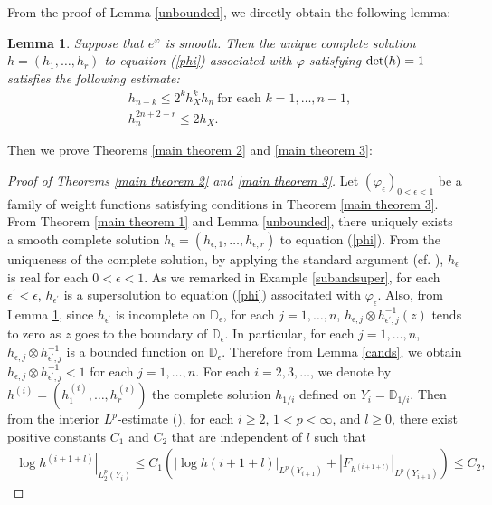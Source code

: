 \documentclass[12pt]{article}
\theoremstyle{definition}
\newtheorem{lemm}[defi]{Lemma}
\def\det{{\rm det}}
\def\det{{\rm det}}
\def\D{{\mathbb D}}
\begin{document}
From the proof of Lemma \ref{unbounded}, we directly obtain the following lemma:
\begin{lemm}\label{khn}{\it Suppose that $e^\varphi$ is smooth. Then the unique complete solution $h=(h_1,\dots, h_r)$ to equation (\ref{phi}) associated with $\varphi$ satisfying $\det(h)=1$ satisfies the following estimate:
\begin{align}
&h_{n-k}\leq 2^kh_X^kh_n \ \text{for each $k=1,\dots, n-1$}, \\
&h_n^{2n+2-r}\leq 2h_X.
\end{align}
}
\end{lemm}
Then we prove Theorems \ref{main theorem 2} and \ref{main theorem 3}:
\begin{proof}[Proof of Theorems \ref{main theorem 2} and \ref{main theorem 3}] Let $(\varphi_\epsilon)_{0<\epsilon<1}$ be a family of weight functions satisfying conditions in Theorem \ref{main theorem 3}. From Theorem \ref{main theorem 1} and Lemma \ref{unbounded}, there uniquely exists a smooth complete solution $h_\epsilon=(h_{\epsilon,1},\dots, h_{\epsilon,r})$ to equation (\ref{phi}). From the uniqueness of the complete solution, by applying the standard argument (cf. \cite[Corollary 3.27]{LM1}), $h_\epsilon$ is real for each $0<\epsilon<1$. As we remarked in Example \ref{subandsuper}, for each $\epsilon^\prime<\epsilon$, $h_{\epsilon^\prime}$ is a supersolution to equation (\ref{phi}) associtated with $\varphi_\epsilon$. Also, from Lemma \ref{khn}, since $h_{\epsilon^\prime}$ is incomplete on $\D_\epsilon$, for each $j=1,\dots, n$, $h_{\epsilon,j}\otimes h_{\epsilon^\prime,j}^{-1}(z)$ tends to zero as $z$ goes to the boundary of $\D_\epsilon$. In particular, for each $j=1,\dots, n$, $h_{\epsilon,j}\otimes h_{\epsilon^\prime,j}^{-1}$ is a bounded function on $\D_\epsilon$. Therefore from Lemma \ref{cands}, we obtain $h_{\epsilon,j}\otimes h_{\epsilon^\prime,j}^{-1}<1$ for each $j=1,\dots, n$. For each $i=2,3,\dots$, we denote by $h^{(i)}=(h^{(i)}_1,\dots, h^{(i)}_r)$ the complete solution $h_{1/i}$ defined on $Y_i=\D_{1/i}$. Then from the interior $L^p$-estimate (\cite[Theorem 9.11]{GT1}), for each $i\geq 2$, $1<p<\infty$, and $l\geq 0$, there exist positive constants $C_1$ and $C_2$ that are independent of $l$ such that
\begin{align*}
|\log h^{(i+1+l)}|_{L^p_2(Y_i)}\leq C_1(|\log h{(i+1+l)}|_{L^p(Y_{i+1})}+|F_{h^{(i+1+l)}}|_{L^p(Y_{i+1})})\leq C_2,
\end{align*}

\end{proof}
\end{document}
